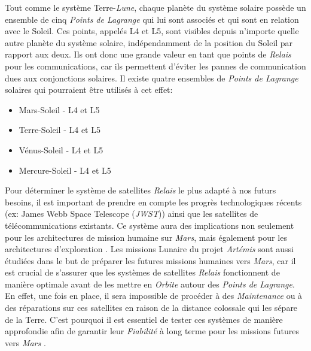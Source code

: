 \documentclass[conference]{IEEEtran}
\begin{document}
Tout comme le système Terre-\emph{Lune}, chaque planète du système solaire possède un ensemble de cinq \emph{Points de Lagrange} qui lui sont associés et qui sont en relation avec le Soleil. Ces points, appelés L4 et L5, sont visibles depuis n'importe quelle autre planète du système solaire, indépendamment de la position du Soleil par rapport aux deux. Ils ont donc une grande valeur en tant que points de \emph{Relais} pour les communications, car ils permettent d'éviter les pannes de communication dues aux conjonctions solaires. Il existe quatre ensembles de \emph{Points de Lagrange} solaires qui pourraient être utilisés à cet effet: 
\begin{itemize}
\item Mars-Soleil - L4 et L5
\item Terre-Soleil - L4 et L5
\item Vénus-Soleil - L4 et L5
\item Mercure-Soleil - L4 et L5
\end{itemize}
Pour déterminer le système de satellites \emph{Relais} le plus adapté à nos futurs besoins, il est important de prendre en compte les progrès technologiques récents (ex: James Webb Space Telescope (\emph{JWST}))  ainsi que les satellites de télécommunications existants. Ce système aura des implications non seulement pour les architectures de mission humaine sur \emph{Mars}, mais également pour les architectures d'exploration \cite{b10}.
Les missions Lunaire du projet \emph{Artémis} sont aussi étudiées dans le but de préparer les futures missions humaines vers \emph{Mars}, car il est crucial de s'assurer que les systèmes de satellites \emph{Relais} fonctionnent de manière optimale avant de les mettre en \emph{Orbite} autour des \emph{Points de Lagrange}. En effet, une fois en place, il sera impossible de procéder à des \emph{Maintenance} ou à des réparations sur ces satellites en raison de la distance colossale qui les sépare de la Terre. C'est pourquoi il est essentiel de tester ces systèmes de manière approfondie afin de garantir leur \emph{Fiabilité} à long terme pour les missions futures vers \emph{Mars} \cite{b12}.
\end{document}
